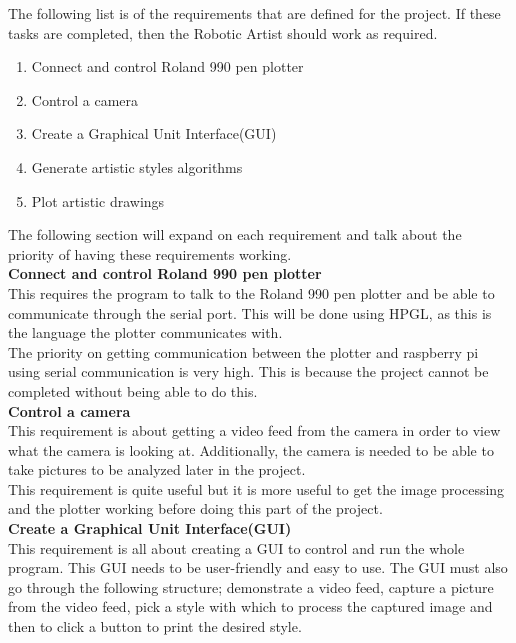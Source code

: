 \documentclass{article}
\begin{document}
The following list is of the requirements that are defined for the project. If these tasks are completed, then the Robotic Artist should work as required.

\begin{enumerate}
  \item Connect and control Roland 990 pen plotter
  \item Control a camera
  \item Create a Graphical Unit Interface(GUI)
  \item Generate artistic styles algorithms
  \item Plot artistic drawings
\end{enumerate}

The following section will expand on each requirement and talk about the priority of having these requirements working.\\ \newline
\textbf{Connect and control Roland 990 pen plotter} \\
This requires the program to talk to the Roland 990 pen plotter and be able to communicate through the serial port. This will be done using HPGL, as this is the language the plotter communicates with.\\ \newline
The priority on getting communication between the plotter and raspberry pi using serial communication is very high. This is because the project cannot be completed without being able to do this.\\ \newline
\textbf{Control a camera} \\
This requirement is about getting a video feed from the camera in order to view what the camera is looking at. Additionally, the camera is needed to be able to take pictures to be analyzed later in the project.
\\ \newline
This requirement is quite useful but it is more useful to get the image processing and the plotter working before doing this part of the project.
\\ \newline
\textbf{Create a Graphical Unit Interface(GUI)}\\ \newline
This requirement is all about creating a GUI to control and run the whole program. This GUI needs to be user-friendly and easy to use. The GUI must also go through the following structure; demonstrate a video feed, capture a picture from the video feed, pick a style with which to process the captured image and then to click a button to print the desired style. \\ \newline
\end{document}
